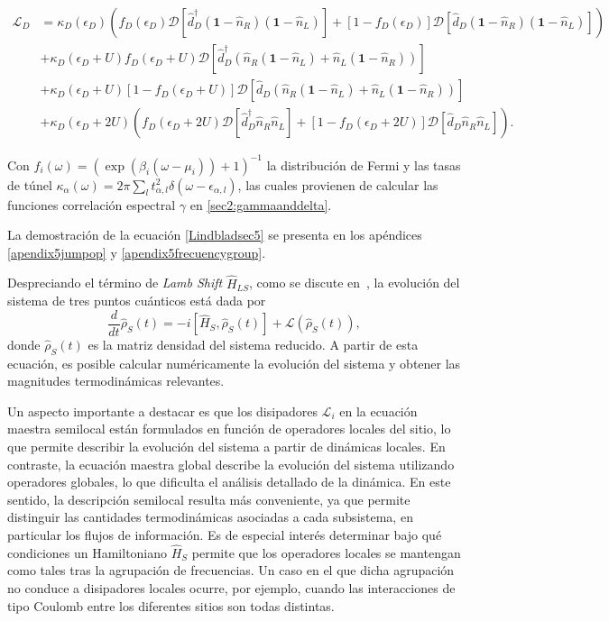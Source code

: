 \begin{align*}
    \mathcal{L}_{D} & = \kappa_{D}(\epsilon_{D})(f_{D}(\epsilon_{D})\mathcal{D}[\hat{d}^{\dagger}_{D}(\textbf{1}-\hat{n}_{R})(\textbf{1}-\hat{n}_{L}) ]  + [1-f_{D}(\epsilon_{D})]\mathcal{D}[\hat{d}_{D}(\textbf{1}-\hat{n}_{R})(\textbf{1}-\hat{n}_{L}) ]  )  \\
                    & + \kappa_{D}(\epsilon_{D}+U)f_{D}(\epsilon_{D}+U)\mathcal{D}[\hat{d}^{\dagger}_{D}(\hat{n}_{R}(\textbf{1}-\hat{n}_{L}) + \hat{n}_{L}(\textbf{1}-\hat{n}_{R})) ]  \\
                    & + \kappa_{D}(\epsilon_{D}+U)[1-f_{D}(\epsilon_{D}+U)]\mathcal{D}[\hat{d}_{D}(\hat{n}_{R}(\textbf{1}-\hat{n}_{L}) + \hat{n}_{L}(\textbf{1}-\hat{n}_{R}))]   \\
                   & + \kappa_{D}(\epsilon_{D}+2U)(f_{D}(\epsilon_{D}+2U)\mathcal{D}[\hat{d}^{\dagger}_{D}\hat{n}_{R}\hat{n}_{L} ]  + [1-f_{D}(\epsilon_{D}+2U)]\mathcal{D}[\hat{d}_{D}\hat{n}_{R}\hat{n}_{L} ]  ).
\end{align*}

Con $f_{i}(\omega) = (\exp(\beta_{i}(\omega - \mu_{i})) + 1)^{-1}$ la distribución de Fermi y  las tasas de túnel $\kappa_{\alpha}(\omega)= 2\pi \sum_{l}t^{2}_{\alpha,l}\delta(\omega-\epsilon_{\alpha,l})$, las cuales provienen de calcular las funciones correlación espectral $\gamma$ en \ref{sec2:gammaanddelta}.

La demostración de la ecuación \ref{Lindbladsec5} se presenta en los apéndices \ref{apendix5jumpop} y \ref{apendix5frecuencygroup}.

Despreciando el término de \textit{Lamb Shift} $\hat{H}_{LS}$, como se discute en~\cite{prech2023entanglement}, la evolución del sistema de tres puntos cuánticos está dada por
\begin{equation}
    \frac{d}{dt}\hat{\rho}_{S}(t) = -i[\hat{H}_{S},\hat{\rho}_{S}(t)] + \mathcal{L}(\hat{\rho}_{S}(t)),
\end{equation}
donde $\hat{\rho}_{S}(t)$ es la matriz densidad del sistema reducido. A partir de esta ecuación, es posible calcular numéricamente la evolución del sistema y obtener las magnitudes termodinámicas relevantes.

Un aspecto importante a destacar es que los disipadores $\mathcal{L}_i$ en la ecuación maestra semilocal están formulados en función de operadores locales del sitio, lo que permite describir la evolución del sistema a partir de dinámicas locales. En contraste, la ecuación maestra global describe la evolución del sistema utilizando operadores globales, lo que dificulta el análisis detallado de la dinámica. En este sentido, la descripción semilocal resulta más conveniente, ya que permite distinguir las cantidades termodinámicas asociadas a cada subsistema, en particular los flujos de información. Es de especial interés determinar bajo qué condiciones un Hamiltoniano $\hat{H}_S$ permite que los operadores locales se mantengan como tales tras la agrupación de frecuencias. Un caso en el que dicha agrupación no conduce a disipadores locales ocurre, por ejemplo, cuando las interacciones de tipo Coulomb entre los diferentes sitios son todas distintas.

